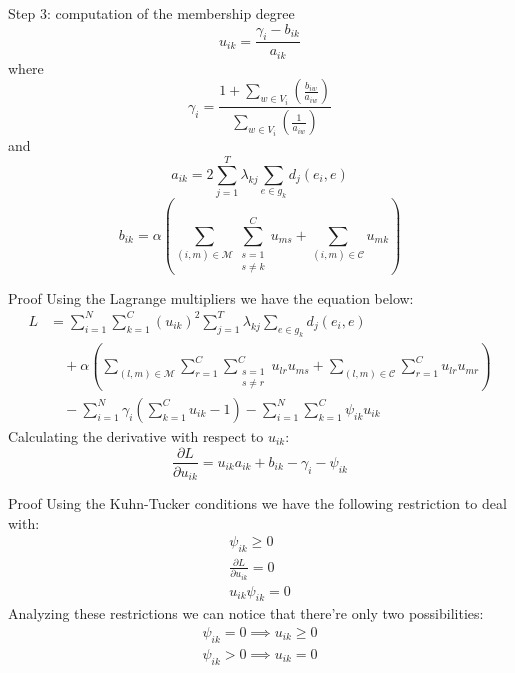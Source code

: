 \documentclass{beamer}
\begin{document}
\begin{frame}{Step 3: computation of the membership degree}
\begin{displaymath}
\label{membership-equation}
u_{ik} =\frac{\gamma_{i} - b_{ik}}{a_{ik}}
\end{displaymath}
where
\begin{displaymath}
\label{gamma-equation}
\gamma_{i}=\frac{1+\sum_{w \in {V_{i}}}(\frac{b_{iw}}{a_{iw}})}{\sum_{w \in {V_{i}}}(\frac{1}{a_{iw}})}
\end{displaymath}
and
\begin{displaymath}
a_{ik}=2\sum_{j=1}^{T}\lambda_{kj}\sum_{e \in g_{k}}d_{j}(e_{i},e)
\end{displaymath}
\begin{displaymath}
b_{ik}=\alpha\left(\sum_{(i,m)\in\mathcal{M}}\sum_{\substack{s=1\\{s}\neq{k}}}^{C}u_{ms}+\sum_{(i,m)\in\mathcal{C}}u_{mk}\right)
\end{displaymath}
\end{frame}

\begin{frame}{Proof}
Using the Lagrange multipliers we have the equation below:
\begin{displaymath}
\begin{split}
L&
=
\sum_{i=1}^{N}
\sum_{k=1}^{C}(u_{ik})^{2}
\sum_{j=1}^{T}\lambda_{kj}
\sum_{{e}\in{g_{k}}}d_{j}(e_{i},e) \\
& \quad +
\alpha
\left (
\sum_{(l,m)\in\mathcal{M}}
\sum_{r=1}^{C}
\sum_{
\substack{
s=1 \\ {s}\neq{r}
}
}^{C}u_{lr}u_{ms}
+
\sum_{(l,m)\in\mathcal{C}}
\sum_{r=1}^{C}u_{lr}u_{mr}
\right ) \\
& \quad -
\sum_{i=1}^{N}\gamma_{i}
\left (
\sum_{k=1}^{C}u_{ik}-1
\right )
-
\sum_{i=1}^{N}
\sum_{k=1}^{C}\psi_{ik}u_{ik}
\end{split}
\end{displaymath}
Calculating the derivative with respect to $u_{ik}$:
\begin{displaymath}
\frac{\partial{L}}{\partial{u_{ik}}}
=
u_{ik}a_{ik}
+
b_{ik}
-
\gamma_{i}
-
\psi_{ik}
\end{displaymath}
\end{frame}

\begin{frame}{Proof}
Using the Kuhn-Tucker conditions we have the following restriction to deal with:
\begin{gather*}
\psi_{ik} \geq 0 \\
\frac{\partial{L}}{\partial{u_{ik}}} = 0 \\
u_{ik} \psi_{ik} = 0
\end{gather*}
Analyzing these restrictions we can notice that there're only two possibilities:
\begin{gather*}
\psi_{ik} = 0 \implies  u_{ik} \geq 0 \\
\psi_{ik} > 0 \implies  u_{ik} = 0
\end{gather*}
\end{frame}
\end{document}

